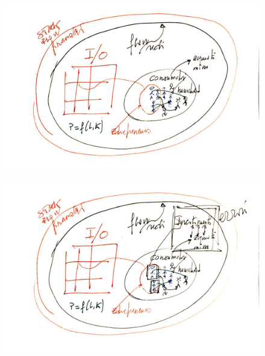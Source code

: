 \documentclass[]{beamer}
\begin{document}
\begin{frame}{3}



\begin{figure}[H]
\center
\includegraphics[scale=0.55]{3.pdf}
\end{figure}

\end{frame}

\begin{frame}{4}



\begin{figure}[H]
\center
\includegraphics[scale=0.55]{4.pdf}
\end{figure}

\end{frame}
\end{document}
